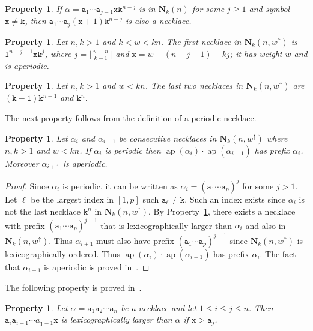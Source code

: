 \documentclass[US-letter,USenglish,authorcolumns,autoref]{lipics-v2021}
\renewcommand{\tt} {\mathtt}
\newtheorem{property}[theorem]{Property}
\newcommand{\bN}{\mathbf{N}}
\DeclareMathOperator{\ap}{ap}
\begin{document}
\begin{property} \label{prop:lastnon}
If $\alpha = \tt{a}_1\cdots \tt{a}_{j-1} \tt{x} \tt{k}^{n-j}$ is in $\bN_k(n)$ for some $j\geq 1$ and symbol $\tt{x} \neq \tt{k}$, then $\tt{a}_1\cdots \tt{a}_j (\tt{x}+1) \tt{k}^{n-j}$ is also a necklace.
\end{property}
 
%
\begin{property} \label{prop:first}
Let $n,k > 1$ and $k < w < kn$.  The first necklace in $\bN_k(n,w^\uparrow)$ is $\tt{1}^{n-j-1}\tt{x}\tt{k}^{j}$,
where $j=\lfloor \frac{w-n}{k-1}\rfloor$ and $\tt{x} = w-(n{-}j{-}1)-kj$; it has weight $w$ and is aperiodic.
\end{property}
%
\begin{property} \label{prop:last}
 Let $n,k > 1$ and $w < kn$.  The last two necklaces in  $\bN_k(n,w^\uparrow)$ are
 $(\tt{k{-}1})\tt{k}^{n-1}$ and $\tt{k}^n$.
\end{property}
%

\noindent
The next property follows from the definition of a periodic necklace.

\begin{property} \label{prop:periodic}
Let $\alpha_i$ and $\alpha_{i+1}$ be consecutive necklaces in $\bN_k(n,w^\uparrow)$ where $n,k > 1$ and $w < kn$.   If $\alpha_i$ is periodic then $\ap(\alpha_i) \cdot \ap(\alpha_{i+1})$ has prefix $\alpha_i$.  Moreover $\alpha_{i+1}$ is aperiodic.
\end{property}
%
\begin{proof}
Since $\alpha_i$ is periodic, it can be written as $\alpha_i = (\tt{a}_1\cdots \tt{a}_p)^j$ for some $j > 1$.  Let $\ell$ be the largest index in $[1,p]$ such $\tt{a}_\ell \neq \tt{k}$.  Such an index exists since $\alpha_i$ is not the last necklace $\tt{k}^n$ in $\bN_k(n,w^\uparrow)$. By Property~\ref{prop:lastnon}, there exists a necklace with prefix $(\tt{a}_1\cdots \tt{a}_p)^{j-1}$ that is lexicographically larger than $\alpha_i$ and also in $\bN_k(n,w^\uparrow)$. Thus $\alpha_{i+1}$ must also have prefix  $(\tt{a}_1\cdots \tt{a}_p)^{j-1}$ since $\bN_k(n,w^\uparrow)$ is lexicographically ordered.  Thus $\ap(\alpha_i) \cdot \ap(\alpha_{i+1})$ has prefix $\alpha_i$. The fact that $\alpha_{i+1}$ is aperiodic is proved in~\cite[Lemma 5]{generalize-classic-greedy}.
\end{proof}

\noindent The following property is proved in~\cite{ranking}.

 \begin{property} \label{prop:suffix}
Let $\alpha = \tt{a}_1\tt{a}_2\cdots \tt{a}_n$ be a necklace and let $1 \leq i \leq  j \leq n$.
Then $\tt{a}_i \tt{a}_{i+1}\cdots a_{\tt{j}-1} \tt{x}$ is lexicographically larger than  $\alpha$ if $\tt{x} > \tt{a}_j$.  
\end{property}
\end{document}
